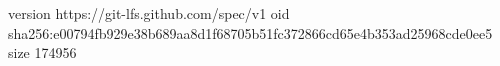 version https://git-lfs.github.com/spec/v1
oid sha256:e00794fb929e38b689aa8d1f68705b51fc372866cd65e4b353ad25968cde0ee5
size 174956
